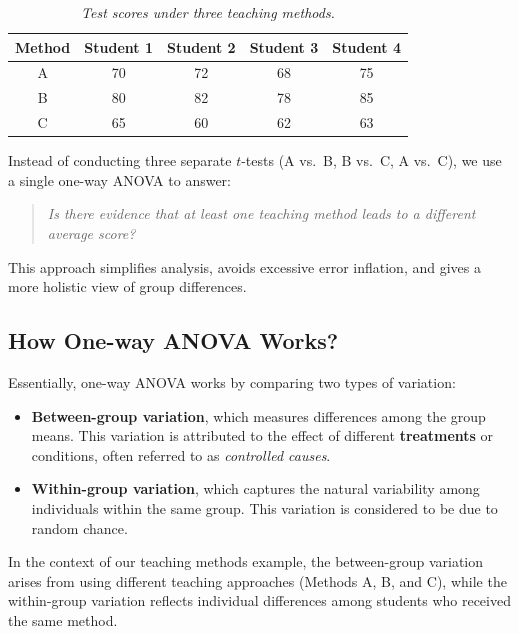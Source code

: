 \documentclass[twoside]{book}
\begin{document}
\begin{table}[H]
\centering
\begin{tabular}{c|cccc}
\toprule
Method & Student 1 & Student 2 & Student 3 & Student 4 \\
\midrule
A      & 70        & 72        & 68        & 75        \\
B      & 80        & 82        & 78        & 85        \\
C      & 65        & 60        & 62        & 63        \\
\bottomrule
\end{tabular}
\caption{\textit{Test scores under three teaching methods.}}
\end{table}

Instead of conducting three separate $t$-tests (A vs.\ B, B vs.\ C, A vs.\ C), we use a single one-way ANOVA to answer:

\begin{quote}
\textit{Is there evidence that at least one teaching method leads to a different average score?}
\end{quote}

This approach simplifies analysis, avoids excessive error inflation, and gives a more holistic view of group differences.

\subsection{How One-way ANOVA Works?}

\noindent Essentially, one-way ANOVA works by comparing two types of variation:

\begin{itemize}
  \item \textbf{Between-group variation}, which measures differences among the group means. This variation is attributed to the effect of different \textbf{treatments} or conditions, often referred to as \textit{controlled causes}.
  \item \textbf{Within-group variation}, which captures the natural variability among individuals within the same group. This variation is considered to be due to random chance.
\end{itemize}

\noindent In the context of our teaching methods example, the between-group variation arises from using different teaching approaches (Methods A, B, and C), while the within-group variation reflects individual differences among students who received the same method.
\end{document}
